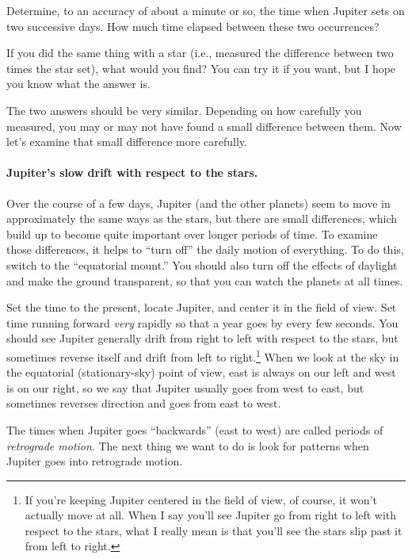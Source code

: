Determine, to an accuracy of about a minute or so, the time when Jupiter sets
on two successive days. How much time elapsed between these two occurrences?

\answerspace{1.5in}

If you did the same thing with a star (i.e., measured the difference between
two times the star set), what would you find? You can try it if you want,
but I hope you know what the answer is.

\answerspace{2in}


The two answers should be very similar. Depending on how carefully you 
measured, you may or may not have found a small difference between them.
Now let's examine that small difference more carefully.

\paragraph{Jupiter's slow drift with respect to the stars.}
Over the course of a few days, Jupiter (and the other planets) seem to
move in approximately the same ways as the stars, but there are 
small differences, which build up to become quite important
over longer periods of time. To examine those differences,
it helps to ``turn off'' the daily motion of everything.
To do this, switch to the ``equatorial mount.''
You should also turn off the effects of daylight and make the ground
transparent,
so that you can watch the planets at all times.


Set the time to the present, locate Jupiter, and center it in the field
of view. Set time running forward \textit{very} rapidly so that a year goes by
every few seconds. You should see Jupiter generally drift from right
to left with respect to the stars, but sometimes reverse itself
and drift from left to right.\footnote{If you're keeping Jupiter 
centered in the field of view, of course, it won't actually move at all.
When I say you'll see Jupiter go from right to left
with respect to the stars, what I really mean
is that you'll see the stars slip past it from left to right.}
When we look at the sky in the equatorial (stationary-sky) point of view, 
east is always on
our left and west is on our right, so we say that Jupiter
usually goes from west to east, but sometimes reverses direction and
goes from east to west.

The times when Jupiter goes ``backwards'' (east to west) are called
periods of \textit{retrograde motion}. The next thing we want to 
do is look for patterns when Jupiter goes into retrograde motion.

